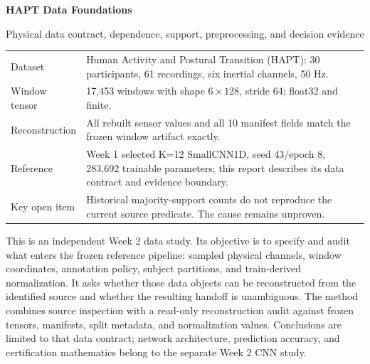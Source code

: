 \documentclass[11pt,a4paper]{article}
\begin{document}
\begin{titlepage}
\vspace{.5cm}
{\huge\bfseries\color{ink}HAPT Data Foundations\par}\vspace{.4cm}
{\Large Physical data contract, dependence, support, preprocessing, and decision evidence\par}\vspace{1cm}
\begin{tabularx}{\linewidth}{@{}P{3.1cm}Y@{}}\toprule
Dataset & Human Activity and Postural Transition (HAPT): 30 participants, 61 recordings, six inertial channels, 50 Hz.\\
Window tensor & 17,453 windows with shape $6\times128$, stride 64; float32 and finite.\\
Reconstruction & All rebuilt sensor values and all 10 manifest fields match the frozen window artifact exactly.\\
Reference & Week 1 selected K=12 SmallCNN1D, seed 43/epoch 8, 283,692 trainable parameters; this report describes its data contract and evidence boundary.\\
Key open item & Historical majority-support counts do not reproduce the current source predicate. The cause remains unproven.\\
\bottomrule\end{tabularx}
\vfill
This is an independent Week 2 data study. Its objective is to specify and audit what enters the frozen reference pipeline: sampled physical channels, window coordinates, annotation policy, subject partitions, and train-derived normalization. It asks whether those data objects can be reconstructed from the identified source and whether the resulting handoff is unambiguous. The method combines source inspection with a read-only reconstruction audit against frozen tensors, manifests, split metadata, and normalization values. Conclusions are limited to that data contract; network architecture, prediction accuracy, and certification mathematics belong to the separate Week 2 CNN study.
\end{titlepage}
\tableofcontents\clearpage
\end{document}

